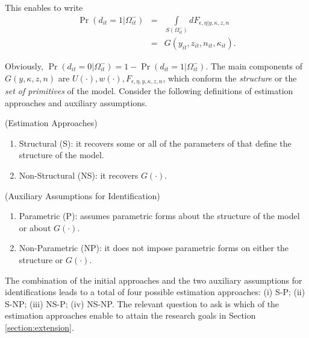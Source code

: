 \indent This enables to write
\begin{eqnarray}
\Pr \left( d_{it} = 1 | \Omega_{it}^{-} \right) &=& \int \limits _{S \left(  \Omega_{it}^- \right)} d F _{\epsilon, \eta |  y, \kappa, z, n} \nonumber \\
&=& G \left( y_{it}, z_{it}, n_{it}, \kappa_{it} \right).
\end{eqnarray}

\noindent Obviously, $\Pr \left( d_{it} = 0 | \Omega_{it}^- \right) = 1 - \Pr \left( d_{it} = 1 | \Omega_{it}^- \right)$. The main components of $G \left( y, \kappa, z, n \right)$ are $U(\cdot), w(\cdot), F _{\epsilon, \eta,  y, \kappa, z, n}$, which conform the \emph{structure} or the \emph{set of primitives} of the model. Consider the following definitions of estimation approaches and auxiliary assumptions.

\begin{definition} (Estimation Approaches) \label{definition:ea}
\begin{enumerate}
\item Structural (S): it recovers some or all of the parameters of that define the structure of the model.
\item Non-Structural (NS): it recovers $G(\cdot)$.
\end{enumerate}
\end{definition}

\begin{definition} (Auxiliary Assumptions for Identification) \label{definition:aa}
\begin{enumerate}
\item Parametric (P): assumes parametric forms about the structure of the model or about $G(\cdot)$.
\item Non-Parametric (NP): it does not impose parametric forms on either the structure or $G(\cdot)$.
\end{enumerate}
\end{definition}

\indent The combination of the initial approaches and the two auxiliary assumptions for identifications leads to a total of four possible estimation approaches: (i) S-P; (ii) S-NP; (iii) NS-P; (iv) NS-NP. The relevant question to ask is which of the estimation approaches enable to attain the research goals in Section \ref{section:extension}.

